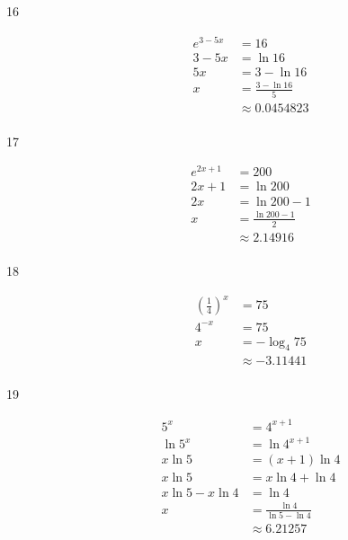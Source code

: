 \documentclass{exam}
\begin{document}
\begin{description}
      \item[16]
        \begin{align*}
          e^{3 - 5x} &= 16 \\
          3 - 5x     &= \ln 16 \\
          5x         &= 3 - \ln 16 \\
          x          &= \frac{3 - \ln 16}{5} \\
                     &\approx \boxed{0.0454823} \\
        \end{align*}

      \item[17]
        \begin{align*}
          e^{2x + 1} &= 200 \\
          2x + 1     &= \ln 200 \\
          2x         &= \ln 200 - 1 \\
          x          &= \frac{\ln 200 - 1}{2} \\
                     &\approx \boxed{2.14916} \\
        \end{align*}

      \item[18]
        \begin{align*}
          \left( \frac{1}{4} \right)^x &= 75 \\
          4^{-x}                       &= 75 \\
          x                            &= -\log_4 75 \\
                                       &\approx \boxed{-3.11441} \\
        \end{align*}

      \item[19]
        \begin{align*}
          5^x               &= 4^{x + 1} \\
          \ln 5^x           &= \ln 4^{x + 1} \\
          x \ln 5           &= (x  + 1) \ln 4 \\
          x \ln 5           &= x \ln 4 + \ln 4 \\
          x \ln 5 - x \ln 4 &= \ln 4 \\
          x                 &= \frac{\ln 4}{\ln 5 - \ln 4} \\
                            &\approx \boxed{6.21257} \\
        \end{align*}


\end{description}
\end{document}
